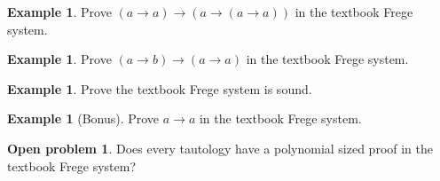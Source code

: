 \documentclass{article}
\theoremstyle{definition}
\newtheorem{exmp}[thrm]{Example}
\newtheorem{prbl}[thrm]{Open problem}
\begin{document}
\begin{exmp}
    Prove $(a \to a) \to (a \to (a \to a))$ in the textbook Frege system.
\end{exmp}

\begin{exmp}
    Prove $(a\to b) \to (a \to a)$ in the textbook Frege system.
\end{exmp}

\begin{exmp}
    Prove the textbook Frege system is sound.
\end{exmp}

\begin{exmp}[Bonus]
    Prove $a \to a$ in the textbook Frege system.
\end{exmp}


\begin{prbl}
    Does every tautology have a polynomial sized proof in the textbook Frege system?
\end{prbl}
\end{document}
